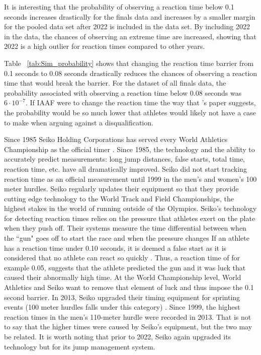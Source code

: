 \documentclass[12pt, letterpaper, titlepage]{article}
\begin{document}
It is interesting that the probability of observing a reaction time below 0.1
seconds increases drastically for the finals data and increases by a smaller margin
for the pooled data set after 2022 is included in the data set.  By including 2022
in the data, the chances of observing an extreme time are increased, showing that
2022 is a high outlier for reaction times compared to other years.


Table ~\ref{tab:Sim_probability} shows that changing the reaction time barrier from 0.1 seconds to
0.08 seconds drastically reduces the chances of observing a reaction time that
would break the barrier.  For the dataset of all finals data, the probability
associated with observing a reaction time below 0.08 seconds was $6\cdot10^{-7}$.
If IAAF were to change the reaction time the way that \citet{komi2009iaaf}'s paper
suggests, the probability would be so much lower that athletes would likely not
have a case to make when arguing against a disqualification.


Since 1985 Seiko Holding Corporations has served every World Athletics Championship
as the official timer \citep{wa2022seiko}.  Since 1985, the technology and the ability
to accurately predict measurements: long jump distances, false starts, total time,
reaction time, etc. have all dramatically improved.  Seiko did not start tracking
reaction time as an official measurement until 1999 in the men's and women's 100 meter
hurdles.  Seiko regularly updates their equipment so that they provide cutting edge
technology to the World Track and Field Championships, the highest stakes in the world
of running outside of the Olympics. Seiko's technology for detecting reaction 
times relies on the pressure that athletes
exert on the plate when they push off.  Their systems measure the time differential
between when the ``gun" goes off to start the race and when the pressure changes 
\citep{wa2022seiko}  If an athlete has a reaction time under 0.10 seconds, it is deemed a 
false start as it is considered that no athlete can react so quickly 
\citep{Seiko-Timing}.  Thus, a reaction time of for example 0.05, suggests that 
the athlete predicted the gun and it was luck that caused their abnormally high 
time.  At the World Championship level, World Athletics and Seiko want to remove 
that element of luck and thus impose the 0.1 second barrier. In 2013, Seiko 
upgraded their timing equipment for sprinting events (100 meter hurdles falls 
under this category) \citep{wa2013backtage}.  Since 1999, the highest reaction 
times in the men's 110-meter hurdle were recorded in 2013.  That is not to say that the higher 
times were caused by Seiko's equipment, but the two may be related.  It is worth noting that prior
to 2022, Seiko again upgraded its technology but for its jump management system.
\end{document}

